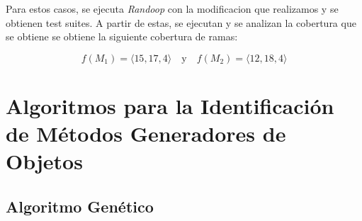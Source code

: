 Para estos casos, se ejecuta \emph{Randoop} con la modificacion que realizamos y se obtienen test suites.
A partir de estas, se ejecutan y se analizan la cobertura que se obtiene se obtiene la siguiente cobertura de ramas:

\[
f(M_1) = \langle 15, 17, 4 \rangle \quad \text{y} \quad f(M_2) = \langle 12, 18, 4 \rangle
\]




\section{Algoritmos para la Identificación de Métodos Generadores de Objetos}
\label{sec:algorithms}


\subsection{Algoritmo Genético}
\label{alg:approachGA}

